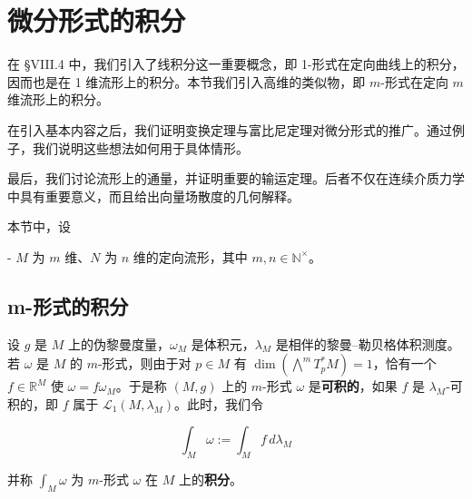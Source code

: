 \section{微分形式的积分}

在 §VIII.4 中，我们引入了线积分这一重要概念，即 1-形式在定向曲线上的积分，因而也是在 1 维流形上的积分。本节我们引入高维的类似物，即 $ m $-形式在定向 $ m $ 维流形上的积分。

在引入基本内容之后，我们证明变换定理与富比尼定理对微分形式的推广。通过例子，我们说明这些想法如何用于具体情形。

最后，我们讨论流形上的通量，并证明重要的输运定理。后者不仅在连续介质力学中具有重要意义，而且给出向量场散度的几何解释。

本节中，设

- $ M $ 为 $ m $ 维、$ N $ 为 $ n $ 维的定向流形，其中 $ m, n \in \mathbb{N}^{\times} $。

\subsection*{m-形式的积分}

设 $ g $ 是 $ M $ 上的伪黎曼度量，$ \omega_M $ 是体积元，$ \lambda_M $ 是相伴的黎曼–勒贝格体积测度。若 $ \omega $ 是 $ M $ 的 $ m $-形式，则由于对 $ p \in M $ 有 $ \dim(\bigwedge^m T_p^* M) = 1 $，恰有一个 $ f \in \mathbb{R}^M $ 使 $ \omega = f \omega_M $。于是称 $ (M, g) $ 上的 $ m $-形式 $ \omega $ 是\textbf{可积的}，如果 $ f $ 是 $ \lambda_M $-可积的，即 $ f $ 属于 $ \mathcal{L}_1(M, \lambda_M) $。此时，我们令

\begin{equation}
\int_M \omega := \int_M f \, d\lambda_M\tag{2.1}
\end{equation}

并称 $ \int_M \omega $ 为 $ m $-形式 $ \omega $ 在 $ M $ 上的\textbf{积分}。

